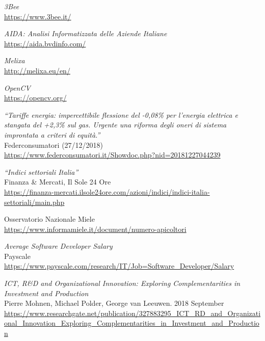 \newpage
\begin{thebibliography}{99}


\emph{3Bee} \\
\url{https://www.3bee.it/
}

\emph{AIDA: Analisi Informatizzata delle Aziende Italiane} \\
\url{https://aida.bvdinfo.com/}

\emph{Melixa} \\
\url{http://melixa.eu/en/}

\emph{OpenCV} \\
\url{https://opencv.org/}

\emph{``Tariffe energia: impercettibile flessione del -0,08\% per l’energia
elettrica e stangata del +2,3\% sul gas. Urgente una riforma degli oneri di
sistema improntata a criteri di equità.''} \\
Federconsumatori (27/12/2018) \\
\url{https://www.federconsumatori.it/Showdoc.php?nid=20181227044239}

\emph{``Indici settoriali Italia''} \\
Finanza \& Mercati, Il Sole 24 Ore \\
\url{https://finanza-mercati.ilsole24ore.com/azioni/indici/indici-italia-settoriali/main.php}

Osservatorio Nazionale Miele \\
\url{https://www.informamiele.it/document/numero-apicoltori}

\emph{Average Software Developer Salary} \\
Payscale \\
\url{https://www.payscale.com/research/IT/Job=Software_Developer/Salary}

\emph{ICT, R\&D and Organizational Innovation: Exploring Complementarities in
Investment and Production} \\
Pierre Mohnen, Michael Polder, George van Leeuwen. 2018 September\\
\url{https://www.researchgate.net/publication/327883295_ICT_RD_and_Organizational_Innovation_Exploring_Complementarities_in_Investment_and_Production}

\end{thebibliography}
